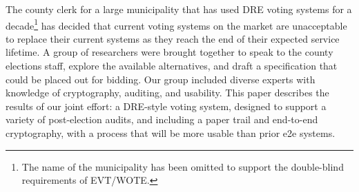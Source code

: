   The county clerk for a large municipality that has used DRE voting
  systems for a decade\footnote{The name of the municipality has been
    omitted to support the double-blind requirements of EVT/WOTE.} has
  decided that current voting systems on the market are unacceptable
  to replace their current systems as they reach the end of their
  expected service lifetime. A group of researchers were brought
  together to speak to the county elections staff, explore the
  available alternatives, and draft a specification that could be
  placed out for bidding. Our group included diverse experts with
  knowledge of cryptography, auditing, and usability. This paper
  describes the results of our joint effort: a DRE-style voting
  system, designed to support a variety of post-election audits, and
  including a paper trail and end-to-end cryptography, with a process
  that will be more usable than prior e2e systems.
